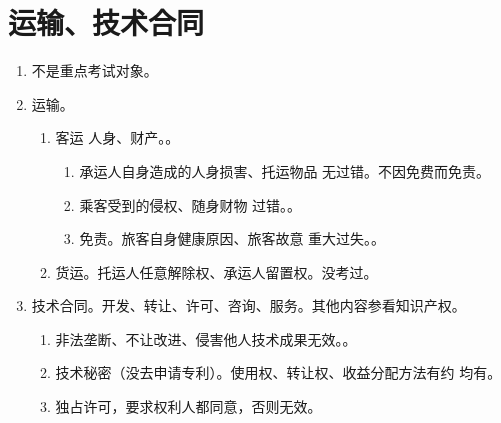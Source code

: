 \section{运输、技术合同}
\begin{enumerate}
  \item 不是重点考试对象。
  \item 运输。
        \begin{enumerate}
          \item 客运 \yjt 人身、财产。。
                \begin{enumerate}
                  \item 承运人自身造成的人身损害、托运物品 \yjt 无过错。不因免费而免责。
                  \item 乘客受到的侵权、随身财物 \yjt 过错。。
                  \item 免责。旅客自身健康原因、旅客故意 \hz 重大过失。。
                \end{enumerate}
          \item 货运。托运人任意解除权、承运人留置权。没考过。
        \end{enumerate}
  \item 技术合同。开发、转让、许可、咨询、服务。其他内容参看知识产权。
        \begin{enumerate}
          \item 非法垄断、不让改进、侵害他人技术成果无效。。
          \item 技术秘密（没去申请专利）。使用权、转让权、收益分配方法有约 \yjt 均有。
          \item 独占许可，要求权利人都同意，否则无效。
        \end{enumerate}
\end{enumerate}
